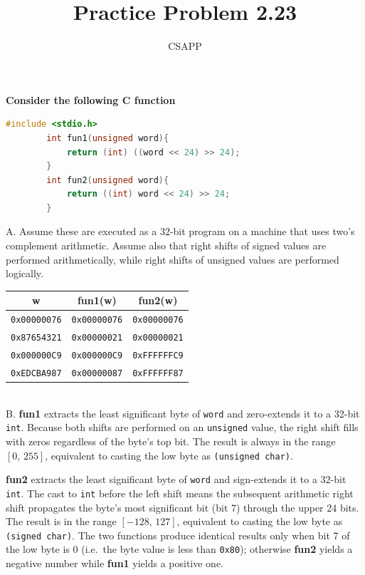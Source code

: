 \documentclass{article}
\title{Practice Problem 2.23}
\author{CSAPP}
\begin{document}
\maketitle
\noindent \textbf{ Consider the following C function }
\begin{center}
\begin{lstlisting}[language=C]
        #include <stdio.h>
        int fun1(unsigned word){
            return (int) ((word << 24) >> 24);
        }
        int fun2(unsigned word){
            return ((int) word << 24) >> 24;
        }
\end{lstlisting}
\end{center}
\begin{flushleft}
        A. Assume these are executed as a 32-bit program on a machine that 
        uses two's complement arithmetic. Assume also that right shifts of signed values are
        performed arithmetically, while right shifts of unsigned values are performed logically.
\smallbreak
\begin{tabular}{ccc}
\textbf{w}          & \textbf{fun1(w)} & \textbf{fun2(w)} \\
\midrule
\texttt{0x00000076} & \texttt{0x00000076} & \texttt{0x00000076}\\
\texttt{0x87654321} & \texttt{0x00000021} & \texttt{0x00000021}\\
\texttt{0x000000C9} & \texttt{0x000000C9} & \texttt{0xFFFFFFC9}\\
\texttt{0xEDCBA987} & \texttt{0x00000087} & \texttt{0xFFFFFF87}\\
\bottomrule
\end{tabular}
\\
\bigskip
        B. \textbf{fun1} extracts the least significant byte of \texttt{word} and
        zero-extends it to a 32-bit \texttt{int}. Because both shifts are performed on an
        \texttt{unsigned} value, the right shift fills with zeros regardless of the byte's
        top bit. The result is always in the range $[0,\, 255]$, equivalent to casting the
        low byte as \texttt{(unsigned char)}.

        \medskip
        \textbf{fun2} extracts the least significant byte of \texttt{word} and
        sign-extends it to a 32-bit \texttt{int}. The cast to \texttt{int} before the left
        shift means the subsequent arithmetic right shift propagates the byte's most
        significant bit (bit 7) through the upper 24 bits. The result is in the range
        $[-128,\, 127]$, equivalent to casting the low byte as \texttt{(signed char)}.
        The two functions produce identical results only when bit 7 of the low byte is 0
        (i.e.\ the byte value is less than \texttt{0x80}); otherwise \textbf{fun2} yields
        a negative number while \textbf{fun1} yields a positive one.
\end{flushleft}
\end{document}
